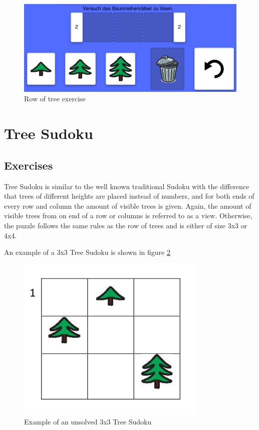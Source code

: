 \begin{figure} 
    \centering
    \includegraphics[width=0.8 \columnwidth]{figures/tree_row_example_exercise.png}
    \caption{Row of tree exercise} 
    \label{fig:tree_row_example_exercise} 
\end{figure}

\section{Tree Sudoku}
\label{section:treeSudoku}

\subsection{Exercises}
Tree Sudoku is similar to the well known traditional Sudoku with the difference that trees of different heights are placed instead of numbers, and for both ends of every row and column the amount of visible trees is given. Again, the amount of visible trees from on end of a row or columns is referred to as a view. Otherwise, the puzzle follows the same rules as the row of trees and is either of size 3x3 or 4x4.

\begin{example}
    An example of a 3x3 Tree Sudoku is shown in figure \ref{fig:tree_sudoku_example}
\end{example}

\begin{figure} 
    \centering
    \includegraphics[width=0.4 \columnwidth]{figures/tree_sudoku_example.png}
    \caption{Example of an unsolved 3x3 Tree Sudoku} 
    \label{fig:tree_sudoku_example} 
\end{figure}

